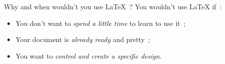 \documentclass[aspectratio=169]{beamer}
\begin{document}
\begin{frame}{Why and when wouldn't you use \LaTeX~?}
  You wouldn't use \LaTeX{} if~:\pause{}
  \begin{itemize}[<+->]
    \item You don't want to \emph{spend a little time} to learn to use it~;
    \item Your document is \emph{already ready} and pretty~;
    \item You want to \emph{control and create a specific design}.
  \end{itemize}
\end{frame}
\end{document}
